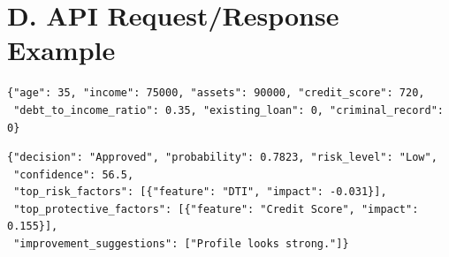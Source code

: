 \documentclass[12pt]{report}
\begin{document}
\section*{D. API Request/Response Example}

\begin{lstlisting}[caption={POST /predict Request}]
{"age": 35, "income": 75000, "assets": 90000, "credit_score": 720,
 "debt_to_income_ratio": 0.35, "existing_loan": 0, "criminal_record": 0}
\end{lstlisting}

\begin{lstlisting}[caption={Response}]
{"decision": "Approved", "probability": 0.7823, "risk_level": "Low",
 "confidence": 56.5,
 "top_risk_factors": [{"feature": "DTI", "impact": -0.031}],
 "top_protective_factors": [{"feature": "Credit Score", "impact": 0.155}],
 "improvement_suggestions": ["Profile looks strong."]}
\end{lstlisting}
\end{document}
